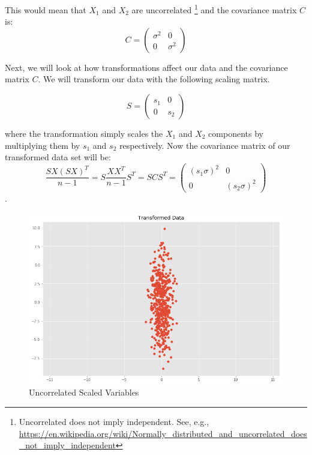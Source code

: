 This would mean that $X_1$ and $X_2$ are uncorrelated \footnote{Uncorrelated does not imply independent. See, e.g., \url{https://en.wikipedia.org/wiki/Normally_distributed_and_uncorrelated_does_not_imply_independent}}
and the covariance matrix $C$ is:
$$C = \left( \begin{array}{ccc}  \sigma^2 & 0 \\  0 & \sigma^2 \end{array} \right)$$

Next, we will look at how transformations affect our data and the covariance matrix $C$. We will transform our data with the following scaling matrix.

$$S = \left( \begin{array}{ccc}  s_{1} & 0 \\  0 & s_{2} \end{array} \right)$$

where the transformation simply scales the $X_1$ and $X_2$ components by multiplying them by $s_{1}$ and $s_{2}$ respectively. Now the covariance matrix of our transformed data set will be:
$$\frac{SX(SX)^T}{n-1}=S\frac{XX^T}{n-1}S^T=SCS^T=\left( \begin{array}{ccc}  (s_{1}\sigma)^2 & 0 \\  0 & (s_{2}\sigma)^2 \end{array} \right)$$.

\begin{figure}[h!]
  \centering
    \includegraphics[scale=0.3]{uncorrelated_scaled.png}
   \caption{Uncorrelated Scaled Variables}
\end{figure}

